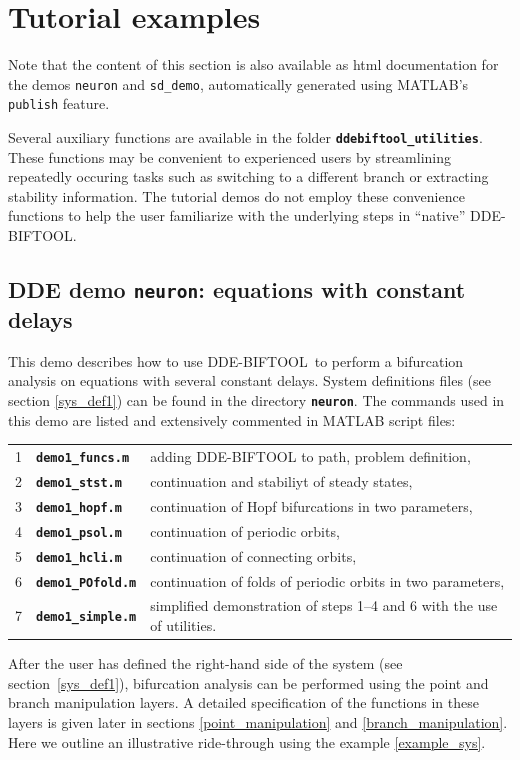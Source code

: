 \documentclass[10pt]{scrartcl}
\newcommand{\DDEBIFCODE}{\textsc{DDE-BIFTOOL}}
\newcommand{\file}[1]{\textbf{\texttt{#1}}}
\newcommand{\blist}[1]{\mbox{\lstinline!#1!}}
\begin{document}
\iffalse
\section{Tutorial examples}\label{demo}
Note that the content of this section is also available as html
documentation for the demos \blist{neuron} and \blist{sd_demo},
automatically generated using MATLAB's \texttt{publish} feature.

Several auxiliary functions are available in the folder
\file{ddebiftool\_utilities}. These functions may be convenient to
experienced users by streamlining repeatedly occuring tasks such as
switching to a different branch or extracting stability
information. The tutorial demos do not employ these convenience
functions  to help the user familiarize with the underlying steps in ``native'' \DDEBIFCODE.
\subsection{DDE demo \file{neuron}: equations with constant delays}
\label{ride-through}
This demo describes how to use \DDEBIFCODE\ to perform a bifurcation
analysis on equations with several constant delays.  System
definitions files (see section \ref{sys_def1}) can be found in the
directory \file{neuron}.  The commands used in this demo are listed
and extensively commented in MATLAB script files:\\
\begin{center}
  \begin{tabular}[t]{rll}
    1 & \file{demo1\_funcs.m} &adding \DDEBIFCODE{} to path, problem definition,\\
    2 & \file{demo1\_stst.m} & continuation and stabiliyt of steady states,\\
    3 & \file{demo1\_hopf.m}& continuation of Hopf bifurcations in two parameters,\\
    4 & \file{demo1\_psol.m} & continuation of periodic orbits,\\[0.5ex]
    5&  \file{demo1\_hcli.m}& continuation of connecting orbits,\\
    6 & \file{demo1\_POfold.m}& continuation of folds of periodic orbits in two 
    parameters,\\
    7 & \file{demo1\_simple.m} & simplified demonstration of steps 1--4 and 6 with the use of utilities.
  \end{tabular}
\end{center}
  
After the user has defined the right-hand side of the system (see
section~\ref{sys_def1}), bifurcation analysis can be performed using
the point and branch manipulation layers. A detailed specification of
the functions in these layers is given later in sections
\ref{point_manipulation} and \ref{branch_manipulation}.  Here
we outline an illustrative ride-through using the example
\eqref{example_sys}.
\end{document}
